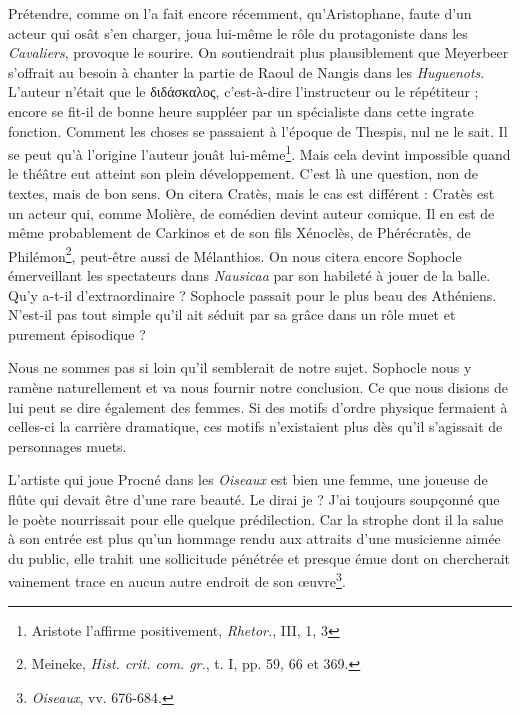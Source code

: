 \documentclass{book}%
\newcommand{\italique}[1]{\textit{#1}}%
\newcommand{\note}[1]{\footnote{#1}}
\begin{document}
Prétendre, comme on l'a fait encore récemment, qu'Aristophane, faute d'un acteur qui osât s'en charger, joua lui-même le rôle du protagoniste dans les \italique{Cavaliers}, provoque le sourire. On soutiendrait plus plausiblement que Meyerbeer s'offrait au besoin à chanter la partie de Raoul de Nangis dans les \italique{Huguenots}. 
L'auteur n'était que le διδάσκαλος, c'est-à-dire l'instructeur ou le répétiteur ; encore se fit-il de bonne heure suppléer par un spécialiste dans cette ingrate fonction. Comment les choses se passaient à l'époque de Thespis, nul ne le sait. Il se peut qu'à l'origine l'auteur jouât lui-même\note{Aristote l'affirme positivement, \italique{Rhetor.}, III, 1, 3}. Mais cela devint impossible quand le théâtre eut atteint son plein développement. 
C'est là une question, non de textes, mais de bon sens. On citera Cratès, mais le cas est différent : Cratès est un acteur qui, comme Molière, de comédien devint auteur comique. Il en est de même probablement de Carkinos et de son fils Xénoclès, de Phérécratès, de Philémon\note{Meineke, \italique{Hist. crit. com. gr.}, t. I, pp. 59, 66 et 369.}, peut-être aussi de Mélanthios. 
On nous citera encore Sophocle émerveillant les spectateurs dans \italique{Nausicaa} par son habileté à jouer de la balle. Qu'y a-t-il d'extraordinaire ? Sophocle passait pour le plus beau des Athéniens. N'est-il pas tout simple qu'il ait séduit par sa grâce dans un rôle muet et purement épisodique ? 

Nous ne sommes pas si loin qu'il semblerait de notre sujet. Sophocle nous y ramène naturellement et va nous fournir notre conclusion. Ce que nous disions de lui peut se dire également des femmes. Si des motifs d'ordre physique fermaient à celles-ci la carrière dramatique, ces motifs n'existaient plus dès qu'il s'agissait de personnages muets. 

L'artiste qui joue Procné dans les \italique{Oiseaux} est bien une femme, une joueuse de flûte qui devait être d'une rare beauté. 
Le dirai je ? J'ai toujours soupçonné que le poète nourrissait pour elle quelque prédilection. Car la strophe dont il la salue à son entrée est plus qu'un hommage rendu aux attraits d'une musicienne aimée du public, elle trahit une sollicitude pénétrée et presque émue dont on chercherait vainement trace en aucun autre endroit de son œuvre\note{\italique{Oiseaux}, vv. 676-684.}. 
\end{document}
